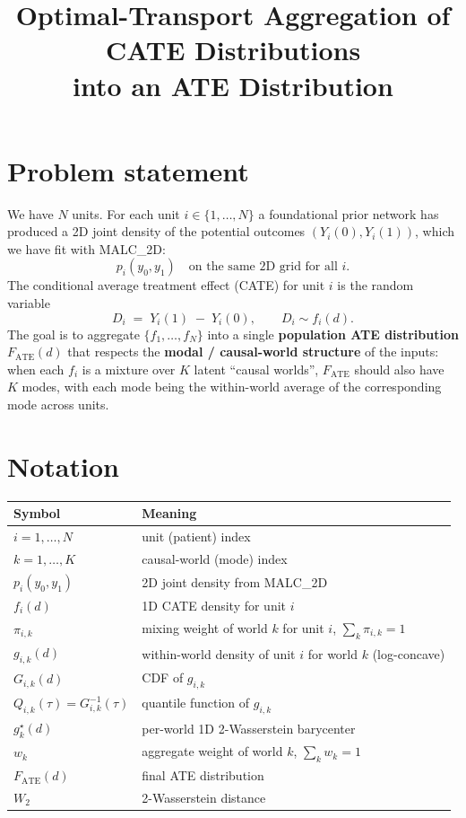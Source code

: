 \documentclass[11pt]{article}
\title{Optimal-Transport Aggregation of CATE Distributions \\ into an ATE Distribution}
\date{}
\newcommand{\W}{W}
\newcommand{\Fate}{F_{\mathrm{ATE}}}
\begin{document}
\maketitle

\section{Problem statement}

We have $N$ units. For each unit $i \in \{1, \dots, N\}$ a foundational prior network has produced a 2D joint density of the potential outcomes $(Y_i(0), Y_i(1))$, which we have fit with MALC\_2D:
\[
  p_i(y_0, y_1) \quad \text{on the same 2D grid for all } i.
\]
The conditional average treatment effect (CATE) for unit $i$ is the random variable
\[
  D_i \;=\; Y_i(1) \;-\; Y_i(0), \qquad D_i \sim f_i(d).
\]
The goal is to aggregate $\{f_1, \dots, f_N\}$ into a single \textbf{population ATE distribution} $\Fate(d)$ that respects the \textbf{modal / causal-world structure} of the inputs: when each $f_i$ is a mixture over $K$ latent ``causal worlds'', $\Fate$ should also have $K$ modes, with each mode being the within-world average of the corresponding mode across units.

\section{Notation}

\begin{center}
\begin{tabular}{ll}
\toprule
Symbol & Meaning \\
\midrule
$i = 1, \dots, N$ & unit (patient) index \\
$k = 1, \dots, K$ & causal-world (mode) index \\
$p_i(y_0, y_1)$ & 2D joint density from MALC\_2D \\
$f_i(d)$ & 1D CATE density for unit $i$ \\
$\pi_{i,k}$ & mixing weight of world $k$ for unit $i$, $\sum_k \pi_{i,k} = 1$ \\
$g_{i,k}(d)$ & within-world density of unit $i$ for world $k$ (log-concave) \\
$G_{i,k}(d)$ & CDF of $g_{i,k}$ \\
$Q_{i,k}(\tau) = G_{i,k}^{-1}(\tau)$ & quantile function of $g_{i,k}$ \\
$g_k^\star(d)$ & per-world 1D 2-Wasserstein barycenter \\
$w_k$ & aggregate weight of world $k$, $\sum_k w_k = 1$ \\
$\Fate(d)$ & final ATE distribution \\
$\W_2$ & 2-Wasserstein distance \\
\bottomrule
\end{tabular}
\end{center}
\end{document}
